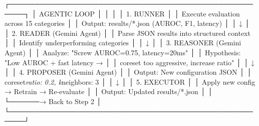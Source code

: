 \documentclass[12pt,a4paper,oneside]{report}
\begin{document}
┌─────────────────────────────────────────────────────┐
│                    AGENTIC LOOP                     │
│                                                     │
│  1. RUNNER                                          │
│     Execute evaluation across 15 categories         │
│     Output: results/*.json (AUROC, F1, latency)     │
│                        ↓                            │
│  2. READER (Gemini Agent)                           │
│     Parse JSON results into structured context      │
│     Identify underperforming categories              │
│                        ↓                            │
│  3. REASONER (Gemini Agent)                         │
│     Analyze: "Screw AUROC=0.75, latency=20ms"       │
│     Hypothesis: "Low AUROC + fast latency →          │
│       coreset too aggressive, increase ratio"        │
│                        ↓                            │
│  4. PROPOSER (Gemini Agent)                         │
│     Output: New configuration JSON                   │
│     {coreset\textit{ratio: 0.2, k}neighbors: 3}            │
│                        ↓                            │
│  5. EXECUTOR                                        │
│     Apply new config → Retrain → Re-evaluate        │
│     Output: Updated results/*.json                   │
│                        └──────→ Back to Step 2      │
└─────────────────────────────────────────────────────┘
\end{document}
